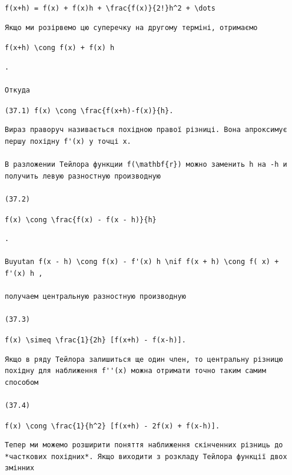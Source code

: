 \documentclass[
  ukrainian,
]{article}
\begin{document}
\texttt{f(x+h)\ =\ f(x)\ +\ f\textquotesingle{}(x)h\ +\ \textbackslash{}frac\{f\textquotesingle{}\textquotesingle{}(x)\}\{2!\}h\^{}2\ +\ \textbackslash{}dots}

\begin{verbatim}
Якщо ми розірвемо цю суперечку на другому терміні, отримаємо
\end{verbatim}

\texttt{f(x+h)\ \textbackslash{}cong\ f(x)\ +\ f\textquotesingle{}(x)\ h}

\begin{verbatim}
.

Откуда
\end{verbatim}

\texttt{(37.1)\ f\textquotesingle{}(x)\ \textbackslash{}cong\ \textbackslash{}frac\{f(x+h)-f(x)\}\{h\}.}

\begin{verbatim}
Вираз праворуч називається похідною правої різниці. Вона апроксимує першу похідну f'(x) у точці x.

В разложении Тейлора функции f(\mathbf{r}) можно заменить h на -h и получить левую разностную производную

(37.2)
\end{verbatim}

\texttt{f\textquotesingle{}(x)\ \textbackslash{}cong\ \textbackslash{}frac\{f(x)\ -\ f(x\ -\ h)\}\{h\}}

\begin{verbatim}
.

Buyutan f(x - h) \cong f(x) - f'(x) h \nif f(x + h) \cong f( x) + f'(x) h ,

получаем центральную разностную производную

(37.3)
\end{verbatim}

\texttt{f\textquotesingle{}(x)\ \textbackslash{}simeq\ \textbackslash{}frac\{1\}\{2h\}\ {[}f(x+h)\ -\ f(x-h){]}.}

\begin{verbatim}
Якщо в ряду Тейлора залишиться ще один член, то центральну різницю похідну для наближення f''(x) можна отримати точно таким самим способом

(37.4)
\end{verbatim}

\texttt{f\textquotesingle{}\textquotesingle{}(x)\ \textbackslash{}cong\ \textbackslash{}frac\{1\}\{h\^{}2\}\ {[}f(x+h)\ -\ 2f(x)\ +\ f(x-h){]}.}

\begin{verbatim}
Тепер ми можемо розширити поняття наближення скінченних різниць до *часткових похідних*. Якщо виходити з розкладу Тейлора функції двох змінних
\end{verbatim}
\end{document}
